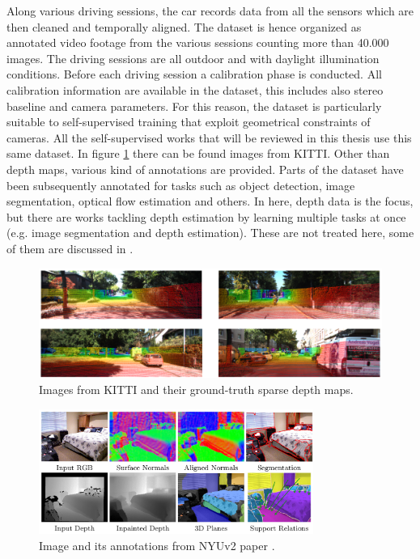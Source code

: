 Along various driving sessions, the car records data from all the sensors which are then cleaned and temporally aligned.
The dataset is hence organized as annotated video footage from the various sessions counting more than 40.000 images.
The driving sessions are all outdoor and with daylight illumination conditions.
Before each driving session a calibration phase is conducted.
All calibration information are available in the dataset, this includes also stereo baseline and camera parameters.
For this reason, the dataset is particularly suitable to self-supervised training that exploit geometrical constraints of cameras.
All the self-supervised works that will be reviewed in this thesis use this same dataset.
In figure \ref{fig:kitti_example} there can be found images from KITTI.
Other than depth maps, various kind of annotations are provided.
Parts of the dataset have been subsequently annotated for tasks such as object detection, image segmentation, optical flow estimation and others.
In here, depth data is the focus, but there are works tackling depth estimation by learning multiple tasks at once (e.g. image segmentation and depth estimation).
These are not treated here, some of them are discussed in \cite{MERTAN2022103441}.

\begin{figure}
	\centering
    \includegraphics[scale=0.4]{figs/kitti_example_2}
    \caption{
        Images from KITTI and their ground-truth sparse depth maps.
        \label{fig:kitti_example}
    }
\end{figure}

\begin{figure}
	\centering
    \includegraphics[width=0.8\textwidth]{figs/nyuv2_example}
    \caption{
        Image and its annotations from NYUv2 paper \cite{NYUv2}.
        \label{fig:nyuv2_example}
    }
\end{figure}

